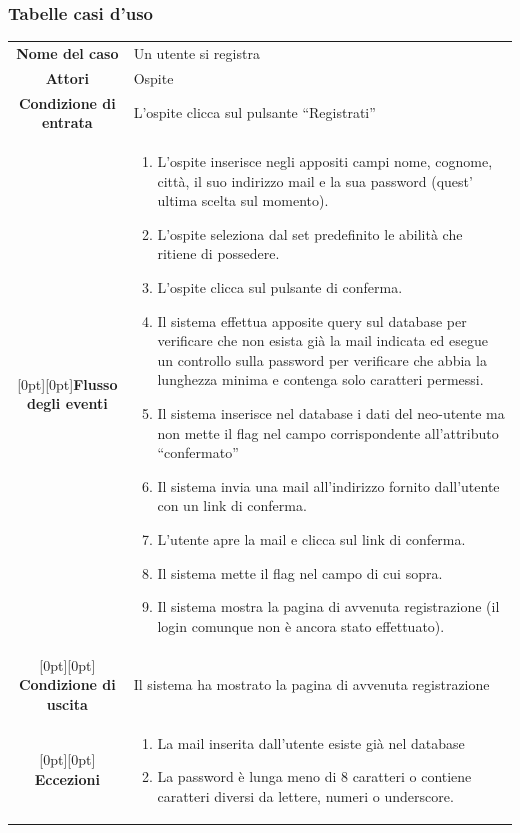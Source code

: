 \documentclass[a4paper,12pt]{article}
\begin{document}
\subsubsection{Tabelle casi d'uso}
\setlength\arrayrulewidth{0.8mm}
\begin{tabularx}{\textwidth}{|c|X|}
\rowcolor[gray]{.9}\hline \textbf{Nome del caso} & Un utente si registra \\ 
\rowcolor[gray]{.9}\hline \textbf{Attori} & Ospite \\ 
\rowcolor[gray]{.9}\hline \textbf{Condizione di entrata} & L'ospite clicca sul pulsante “Registrati” \\ 
\rowcolor[gray]{.9}\hline\raisebox{-27ex}[0pt][0pt]{\textbf{Flusso degli eventi}}& 
\begin{enumerate}
\itemsep0em 
\item L'ospite inserisce negli appositi campi nome, cognome, città, il suo indirizzo mail e la sua password (quest' ultima scelta sul momento).
\item L'ospite seleziona dal set predefinito le abilità che ritiene di possedere.
\item L'ospite clicca sul pulsante di conferma.
\item Il sistema effettua apposite query sul database per verificare che non esista già la mail indicata ed esegue un controllo sulla password per verificare che abbia la lunghezza minima e contenga solo caratteri permessi.
\item Il sistema inserisce nel database i dati del neo-utente ma non mette il flag nel campo corrispondente all'attributo “confermato”
\item Il sistema invia una mail all'indirizzo fornito dall'utente con un link di conferma.
\item L'utente apre la mail e clicca sul link di conferma.
\item Il sistema mette il flag nel campo di cui sopra.
\item Il sistema mostra la pagina di avvenuta registrazione (il login comunque non è ancora stato effettuato).
\end{enumerate}
 \\ 
\rowcolor[gray]{.85}\hline\raisebox{-1ex}[0pt][0pt]{ \textbf{Condizione di uscita}} & Il sistema ha mostrato la pagina di avvenuta registrazione \\
\rowcolor[gray]{.85}\hline\raisebox{-5.5ex}[0pt][0pt] {\textbf{Eccezioni}} & 
\begin{enumerate}
\itemsep0em 
\item La mail inserita dall'utente esiste già nel database
\item La password è lunga meno di 8 caratteri o contiene caratteri diversi da lettere, numeri o underscore.
\end{enumerate}
\\
\hline 
\end{tabularx}
\end{document}
